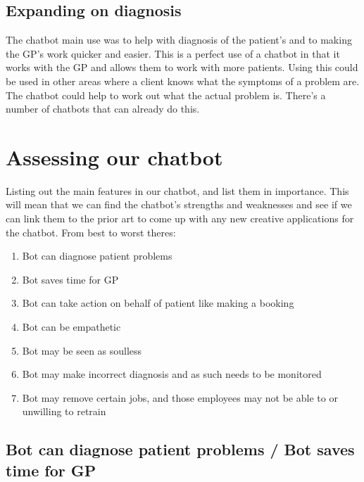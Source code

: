 \documentclass{article}
\begin{document}
\subsection{Expanding on diagnosis}
The chatbot main use was to help with diagnosis of the patient's and to making the GP's work quicker and easier. This is a perfect use of a chatbot in that it works with the GP and allows them to work with more patients.
Using this could be used in other areas where a client knows what the symptoms of a problem are. The chatbot could help to work out what the actual problem is. There's a number of chatbots that can already do this. \cite{gyan}\cite{devops}

\section{Assessing our chatbot}
Listing out the main features in our chatbot, and list them in importance. This will mean that we can find the chatbot's strengths and weaknesses and see if we can link them to the prior art to come up with any new creative applications for the chatbot.
\smallbreak
From best to worst theres:
\begin{enumerate}
    \item Bot can diagnose patient problems
    \item Bot saves time for GP
    \item Bot can take action on behalf of patient like making a booking
    \item Bot can be empathetic
    \item Bot may be seen as soulless
    \item Bot may make incorrect diagnosis and as such needs to be monitored
    \item Bot may remove certain jobs, and those employees may not be able to or unwilling to retrain
\end{enumerate}

\subsection{Bot can diagnose patient problems / Bot saves time for GP} \label{diagnose}
\end{document}
